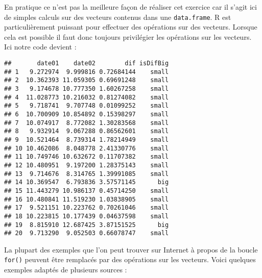 \documentclass[]{book}
\newenvironment{Shaded}{\begin{snugshade}}{\end{snugshade}}
\newcommand{\KeywordTok}[1]{\textcolor[rgb]{0.13,0.29,0.53}{\textbf{#1}}}
\newcommand{\DataTypeTok}[1]{\textcolor[rgb]{0.13,0.29,0.53}{#1}}
\newcommand{\DecValTok}[1]{\textcolor[rgb]{0.00,0.00,0.81}{#1}}
\newcommand{\StringTok}[1]{\textcolor[rgb]{0.31,0.60,0.02}{#1}}
\newcommand{\OperatorTok}[1]{\textcolor[rgb]{0.81,0.36,0.00}{\textbf{#1}}}
\newcommand{\NormalTok}[1]{#1}
\theoremstyle{definition}
\theoremstyle{definition}
\theoremstyle{definition}
\theoremstyle{remark}
\begin{document}
En pratique ce n'est pas la meilleure façon de réaliser cet exercice car
il s'agit ici de simples calculs sur des vecteurs contenus dans une
\texttt{data.frame}. R est particulièrement puissant pour effectuer des
opérations sur des vecteurs. Lorsque cela est possible il faut donc
toujours privilégier les opérations sur les vecteurs. Ici notre code
devient :

\begin{Shaded}
\end{Shaded}

\begin{verbatim}
##       date01    date02        dif isDifBig
## 1   9.272974  9.999816 0.72684144    small
## 2  10.362393 11.059305 0.69691248    small
## 3   9.174678 10.777350 1.60267258    small
## 4  11.028773 10.216032 0.81274082    small
## 5   9.718741  9.707748 0.01099252    small
## 6  10.700909 10.854892 0.15398297    small
## 7  10.074917  8.772082 1.30283568    small
## 8   9.932914  9.067288 0.86562601    small
## 9  10.521464  8.739314 1.78214949    small
## 10 10.462086  8.048778 2.41330776    small
## 11 10.749746 10.632672 0.11707382    small
## 12 10.480951  9.197200 1.28375143    small
## 13  9.714676  8.314765 1.39991085    small
## 14 10.369547  6.793836 3.57571145      big
## 15 11.443279 10.986137 0.45714250    small
## 16 10.480841 11.519230 1.03838905    small
## 17  9.521151 10.223762 0.70261046    small
## 18 10.223815 10.177439 0.04637598    small
## 19  8.815910 12.687425 3.87151525      big
## 20  9.713290  9.052503 0.66078747    small
\end{verbatim}

La plupart des exemples que l'on peut trouver sur Internet à propos de
la boucle \texttt{for()} peuvent être remplacés par des opérations sur
les vecteurs. Voici quelques exemples adaptés de plusieurs sources :
\end{document}
